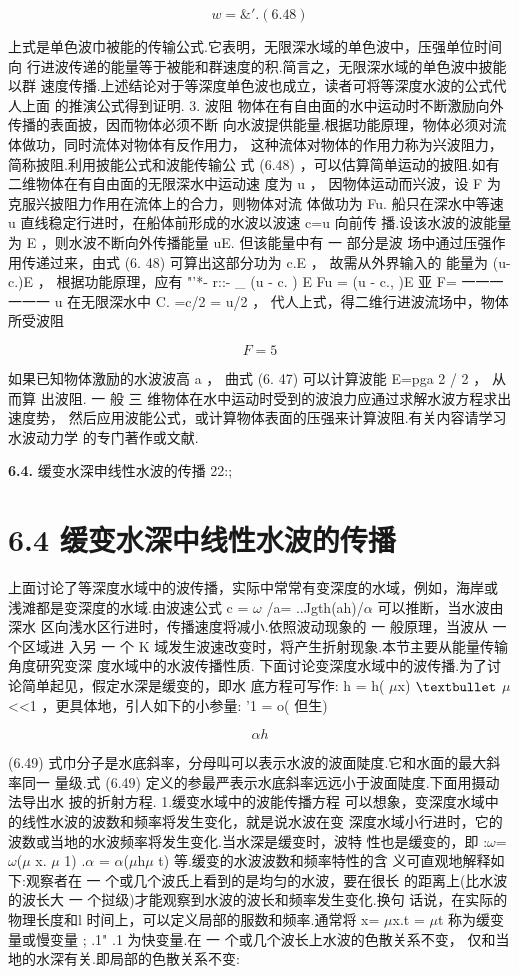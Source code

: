 \[w = \& '. (6. 48)\]

上式是单色波巾被能的传输公式.它表明，无限深水域的单色波中，压强单位时间向 行进波传递的能量等于被能和群速度的积.简言之，无限深水域的单色波中披能以群 速度传播.上述结论对于等深度单色波也成立，读者可将等深度水波的公式代人上面 的推演公式得到证明. 3. 波阻 物体在有自由面的水中运动时不断激励向外传播的表面披，因而物体必须不断 向水波提供能量.根据功能原理，物体必须对流体做功，同时流体对物体有反作用力， 这种流体对物体的作用力称为兴波阻力，简称披阻.利用披能公式和波能传输公 式 (6.48) ，可以估算简单运动的披阻.如有二维物体在有自由面的无限深水中运动速 度为 u ， 因物体运动而兴波，设 F 为克服兴披阻力作用在流体上的合力，则物体对流 体做功为 Fu. 船只在深水中等速 u 直线稳定行进时，在船体前形成的水波以波速 c=u 向前传 播.设该水波的波能量为 E ，则水波不断向外传播能量 uE. 但该能量中有 一 部分是波 场中通过压强作用传递过来，由式 (6. 48) 可算出这部分功为 c.E ， 故需从外界输入的 能量为 (u-c.)E ， 根据功能原理，应有 "'*- r::- \_ (u - c. ) E Fu = (u - c., )E 亚 F= 一一一一一一 u 在无限深水中 C. =c/2 = u/2 ， 代人上式，得二维行进波流场中，物体所受波阻

\[F=5\]

如果已知物体激励的水波波高 a ， 曲式 (6. 47) 可以计算波能 E=pga 2 / 2 ， 从而算 出波阻. 一 般 三 维物体在水中运动时受到的波浪力应通过求解水波方程求出速度势， 然后应用波能公式，或计算物体表面的压强来计算波阻.有关内容请学习水波动力学 的专门著作或文献.

\noindent\textbf{6.4.} 缓变水深申线性水波的传播 22:;

\section*{6.4  缓变水深中线性水波的传播}

上面讨论了等深度水域中的波传播，实际中常常有变深度的水域，例如，海岸或 浅滩都是变深度的水域.由波速公式 c = $\omega$ /a= ..Jgth(ah)/$\alpha$ 可以推断，当水波由深水 区向浅水区行进时，传播速度将减小.依照波动现象的 一 般原理，当波从 一 个区域进 入另 一 个 K 域发生波速改变时，将产生折射现象.本节主要从能量传输角度研究变深 度水域中的水波传播性质. 下面讨论变深度水域中的波传播.为了讨论简单起见，假定水深是缓变的，即水 底方程可写作: h = h( $\mu$x) ${\rm •}$ $\mu$<<1 ，更具体地，引人如下的小参量: '1 = o( 但生)

\[\alpha h\]

(6.49) 式巾分子是水底斜率，分母叫可以表示水波的波面陡度.它和水面的最大斜率同一 量级.式 (6.49) 定义的参最严表示水底斜率远远小于波面陡度.下面用摄动法导出水 披的折射方程. 1.缓变水域中的波能传播方程 可以想象，变深度水域中的线性水波的波数和频率将发生变化，就是说水波在变 深度水域小行进时，它的波数或当地的水波频率将发生变化.当水深是缓变时，波特 性也是缓变的，即 :$\omega$=$\omega$($\mu$ x. $\mu$ 1) .$\alpha$ = $\alpha$($\mu$h$\mu$ t) 等.缓变的水波波数和频率特性的含 义可直观地解释如下:观察者在 一 个或几个波氏上看到的是均匀的水波，要在很长 的距离上(比水波的波长大 一 个挝级)才能观察到水波的波长和频率发生变化.换句 话说，在实际的物理长度和l 时间上，可以定义局部的服数和频率.通常将 x= $\mu$x.t = $\mu$t 称为缓变量或慢变量 ; .1" .1 为快变量.在 一 个或几个波长上水波的色散关系不变， 仅和当地的水深有关.即局部的色散关系不变:

